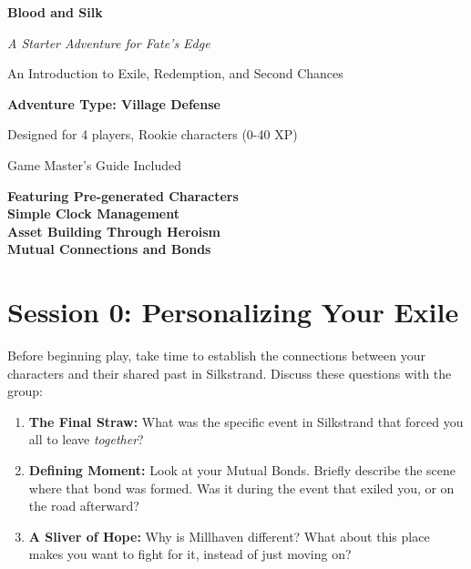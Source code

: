 \documentclass[11pt]{article}
\begin{document}
\begin{titlepage}
\centering
\vspace*{2cm}

{\Huge\bfseries\color{headercolor} Blood and Silk} 

\vspace{0.5cm}

{\Large\itshape A Starter Adventure for Fate's Edge}

\vspace{1cm}

{\large An Introduction to Exile, Redemption, and Second Chances}

\vspace{2cm}

{\Large\bfseries Adventure Type: Village Defense}

\vspace{1cm}

{\large Designed for 4 players, Rookie characters (0-40 XP)}

\vspace{1cm}

{\large Game Master's Guide Included}

\vfill

{\large 
\textbf{Featuring Pre-generated Characters} \\
\textbf{Simple Clock Management} \\
\textbf{Asset Building Through Heroism} \\
\textbf{Mutual Connections and Bonds}
}

\end{titlepage}

\newpage

\tableofcontents

\newpage

\section{Session 0: Personalizing Your Exile}

Before beginning play, take time to establish the connections between your characters and their shared past in Silkstrand. Discuss these questions with the group:

\begin{enumerate}
\item \textbf{The Final Straw:} What was the specific event in Silkstrand that forced you all to leave \textit{together}?
\item \textbf{Defining Moment:} Look at your Mutual Bonds. Briefly describe the scene where that bond was formed. Was it during the event that exiled you, or on the road afterward?
\item \textbf{A Sliver of Hope:} Why is Millhaven different? What about this place makes you want to fight for it, instead of just moving on?
\end{enumerate}
\end{document}
